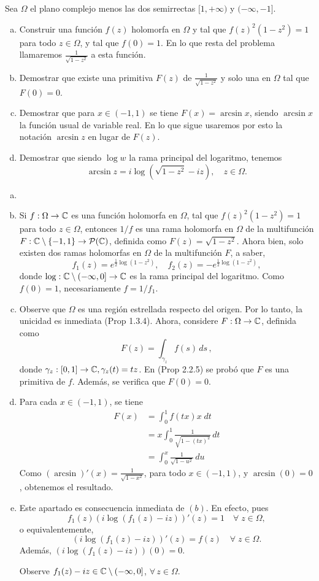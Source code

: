 \documentclass[twoside]{article}
\begin{document}
\begin{ejercicio}{10}
 Sea $\Omega$ el plano complejo menos las dos semirrectas $[1,+\infty)$ y $(-\infty,-1]$.
\begin{enumerate}[(a)]
\item Construir una función $f(z)$ holomorfa en $\Omega$ y tal que $f(z)^2(1-z^2)=1$ para todo $z\in\Omega$, y tal que $f(0)=1$. En lo que resta del problema llamaremos $\frac{1}{\sqrt{1-z^2}}$ a esta función.
\item Demostrar que existe una primitiva $F(z)$ de $\frac{1}{\sqrt{1-z^2}}$ y solo una en $\Omega$ tal que \mbox{$F(0)=0$.}
\item Demostrar que para $x\in(-1,1)$ se tiene $F(x)=\arcsin{x}$, siendo $\arcsin{x}$ la función usual de variable real. En lo que sigue usaremos por esto la notación $\arcsin{z}$ en lugar de $F(z)$. 
\item Demostrar que siendo $\log{w}$ la rama principal del logaritmo, tenemos 
\[\arcsin{z}=i\log(\sqrt{1-z^2}-iz),\quad z\in\Omega.\]
\end{enumerate}
\end{ejercicio}
\begin{solucion}

\begin{enumerate}[(a)]
\item[]
\item Si $f:\Omega \to \mathbb{C} $ es una función holomorfa en $\Omega $, tal que $f(z)^2(1-z^2)=1$ para todo $z\in\Omega $, entonces $1/f$ es una rama holomorfa en $\Omega $ de la multifunción {$F:\mathbb{C} \setminus \{-1,1\}\to \mathcal{P} (\mathbb{C} )$,} definida como $F(z)=\sqrt{1-z^2}$. Ahora bien, solo existen dos ramas holomorfas en $\Omega $ de la multifunción $F$, a saber, 
\[f_1(z)=e^{\frac{1}{2}\log(1-z^2)},\quad f_2(z)=-e^{\frac{1}{2}\log(1-z^2)},\]
donde $\log:\mathbb{C} \setminus {(-\infty,0]}\to\mathbb{C} $ es la rama principal del logaritmo. Como $f(0)=1$, necesariamente $f=1/f_1$. 
\item Observe que $\Omega $ es una región estrellada respecto del origen. Por lo tanto, la unicidad es inmediata (Prop 1.3.4). Ahora, considere $F:\Omega \to\mathbb{C} $, definida como 
\[F(z)=\int_{\gamma_z} f(s)\,ds\,,\]
donde $\gamma_z:[0,1]\to \mathbb{C} , \gamma_z(t)=tz$. En (Prop 2.2.5) se probó que $F$ es una primitiva de $f$. Además, se verifica que $F(0)=0$.
\item Para cada $x\in(-1,1)$, se tiene
\begin{align*}
F(x) & = \int_0^{1}f(tx)x\;dt\\
     & = x\int_0^{1}\frac{1}{\sqrt{1-(tx)^2}}\,dt\\
     & = \int_0^x\frac{1}{\sqrt{1-u^2}}\,du
\end{align*}
Como $(\arcsin)'(x)=\frac{1}{\sqrt{1-x^2}}$, para todo $x\in(-1,1)$, y $\arcsin(0)=0$, obtenemos el resultado. 
\item Este apartado es consecuencia inmediata de $(b)$. En efecto, pues 
\[f_1(z)(i\log(f_1(z)-iz))'(z)=1\quad\forall\;z\in\Omega ,\]
o equivalentemente, 
\[(i\log(f_1(z)-iz))'(z)=f(z)\quad\forall\;z\in\Omega .\]
Además, $(i\log(f_1(z)-iz))(0)=0$.

Observe $f_1(z)-iz\in\mathbb{C} \setminus {(-\infty,0]}$, $\forall\,z\in\Omega $.
\end{enumerate}
\end{solucion}
\newpage
\end{document}
